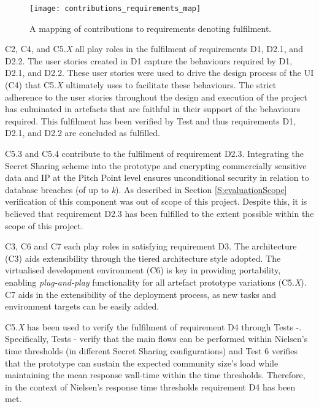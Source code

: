 \begin{figure}[ht]
    \centering
    \texttt{[image: contributions\_requirements\_map]}
    \caption{A mapping of contributions to requirements denoting fulfilment.}
    \label{fig:contribution_requirements_mapping}
\end{figure}

C2, C4, and C5.{\em X} all play roles in the fulfilment of requirements D1, D2.1, and D2.2. The user stories created in D1 capture the behaviours required by D1, D2.1, and D2.2. These user stories were used to drive the design process of the UI (C4) that C5.{\em X} ultimately uses to facilitate these behaviours. The strict adherence to the user stories throughout the design and execution of the project has culminated in artefacts that are faithful in their support of the behaviours required. This fulfilment has been verified by Test  and thus requirements D1, D2.1, and D2.2 are concluded as fulfilled.

C5.3 and C5.4 contribute to the fulfilment of requirement D2.3. Integrating the Secret Sharing scheme into the prototype and encrypting commercially sensitive data and IP at the Pitch Point level ensures unconditional security in relation to database breaches (of up to \textit{k}). As described in Section \ref{S:evaluationScope} verification of this component was out of scope of this project. Despite this, it is believed that requirement D2.3 has been fulfilled to the extent possible within the scope of this project.

C3, C6 and C7 each play roles in satisfying requirement D3. The architecture (C3) aids extensibility through the tiered architecture style adopted. The virtualised development environment (C6) is key in providing portability, enabling \textit{plug-and-play} functionality for all artefact prototype variations (C5.{\em X}). C7 aids in the extensibility of the deployment process, as new tasks and environment targets can be easily added.

C5.{\em X} has been used to verify the fulfilment of requirement D4 through Tests -. Specifically, Tests - verify that the main flows can be performed within Nielsen's time thresholds (in different Secret Sharing configurations) and Test 6 verifies that the prototype can sustain the expected community size's load while maintaining the mean response wall-time within the time thresholds. Therefore, in the context of Nielsen's response time thresholds requirement D4 has been met.

